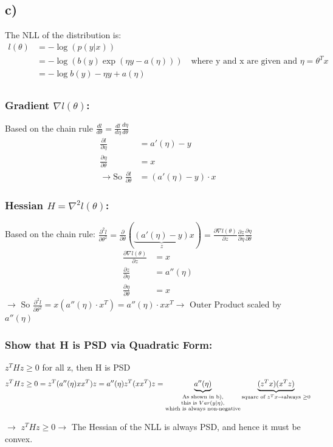 \begin{answer}
    \subsection*{c)}
The NLL of the distribution is:
\begin{align*}
    l(\theta) &= -\log(p(y|x)) \\
    &= -\log(b(y)\exp(\eta y - a(\eta))) \quad \text{where y and x are given and } \eta = \theta^T x\\
    &= -\log b(y) - \eta y + a(\eta) \\
\end{align*}

\subsubsection*{Gradient $\nabla l(\theta)$:}

Based on the chain rule $\frac{dl}{d\theta} = \frac{dl}{d\eta} \frac{d\eta}{d\theta}$
\begin{align*}
    \frac{\partial l}{\partial \eta} &= a'(\eta) - y \\
    \frac{\partial \eta}{\partial \theta} &= x \\
    \rightarrow \text{So } \frac{\partial l}{\partial \theta} &= (a'(\eta) - y) \cdot x
\end{align*}

\subsubsection*{Hessian $H = \nabla^2 l(\theta)$:}
Based on the chain rule: $\frac{\partial^2 l}{\partial \theta^2} = \frac{\partial}{\partial \theta}(\underbrace{(a'(\eta)-y)}_{z}x) = \frac{\partial \nabla l(\theta)}{\partial z} \frac{\partial z}{\partial \eta} \frac{\partial \eta}{\partial \theta}$ \\
\begin{align*}
    \frac{\partial \nabla l(\theta)}{\partial z} &= x\\
    \frac{\partial z}{\partial \eta} &= a''(\eta) \\
    \frac{\partial \eta}{\partial \theta} &= x
\end{align*}
$\rightarrow$ So $\frac{\partial^2 l}{\partial \theta^2} = x(a''(\eta) \cdot x^T) = a''(\eta) \cdot x x^T 
\rightarrow$ Outer Product scaled by $a''(\eta)$ \\


\subsubsection*{Show that H is PSD via Quadratic Form:}
$z^T H z \ge 0$ for all z, then H is PSD \\
\[
z^T H z \ge 0 = z^T(a''(\eta) x x^T)z = a''(\eta) z^T(x x^T)z = \underbrace{a''(\eta)}_{\substack{\text{As shown in b),} \\ \text{this is $Var(y|\eta)$,} \\ \text{which is always non-negative}}} \underbrace{(z^T x)(x^T z)}_{\text{square of } z^T x \\ \rightarrow \text{always } \ge 0}
\]

$\rightarrow$ $z^T H z \ge 0 \rightarrow$ The Hessian of the NLL is always PSD, and hence it must be convex.


\end{answer}
